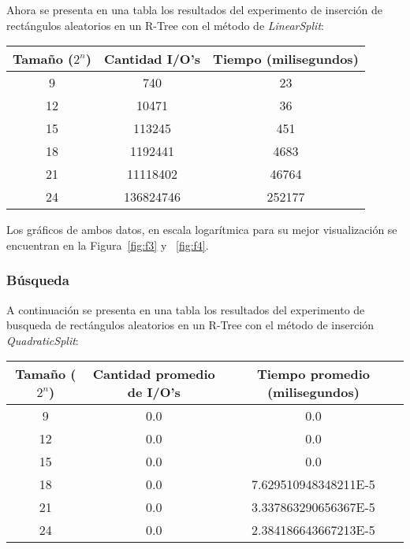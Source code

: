 \documentclass[letterpaper,12pt]{article}
\begin{document}
Ahora se presenta en una tabla los resultados del experimento de inserción de rectángulos aleatorios en un R-Tree con el método de \textit{LinearSplit}: \\
\begin{tabular}{|c|c|c|}
\hline
\textbf{Tama\~no ($2^n$)} & \textbf{Cantidad I/O's} & \textbf{Tiempo (milisegundos)} \\
\hline
9 & 740 & 23 \\
\hline
12 & 10471 & 36 \\
\hline
15 & 113245 & 451 \\
\hline
18 & 1192441 & 4683 \\
\hline
21 & 11118402 & 46764 \\
\hline
24 & 136824746 & 252177 \\
\hline
\end{tabular}

Los gr\'aficos de ambos datos, en escala logar\'itmica para su mejor visualizaci\'on se encuentran en la Figura~\ref{fig:f3} y ~\ref{fig:f4}.

\subsubsection{Búsqueda}
A continuación se presenta en una tabla los resultados del experimento de busqueda de rectángulos aleatorios en un R-Tree con el método de inserción \textit{QuadraticSplit}: \\
\begin{tabular}{|c|c|c|}
\hline
\textbf{Tama\~no ($2^n$)} & \textbf{Cantidad promedio de I/O's} & \textbf{Tiempo promedio (milisegundos)} \\
\hline
9 & 0.0 & 0.0 \\
\hline
12 & 0.0 & 0.0 \\
\hline
15 & 0.0 & 0.0 \\
\hline
18 & 0.0 & 7.629510948348211E-5 \\
\hline
21 & 0.0 & 3.337863290656367E-5 \\
\hline
24 & 0.0 & 2.384186643667213E-5 \\
\hline
\end{tabular}
\\ \\
\end{document}
